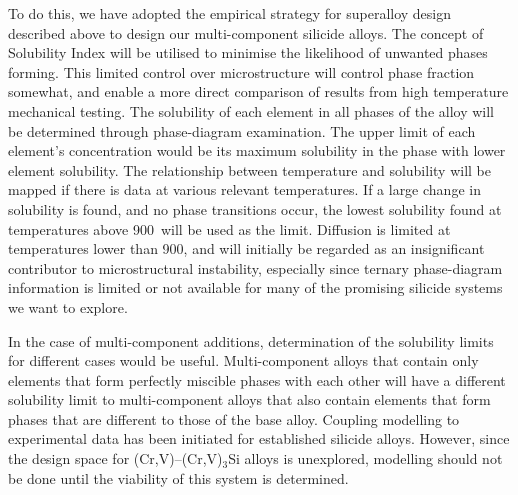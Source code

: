 To do this, we have adopted the empirical strategy for superalloy design described above to design our multi-component silicide alloys.  The concept of Solubility Index will be utilised to minimise the likelihood of unwanted phases forming.  This limited control over microstructure will control phase fraction somewhat, and enable a more direct comparison of results from high temperature mechanical testing.  The solubility of each element in all phases of the alloy will be determined through phase-diagram examination.  The upper limit of each element’s concentration would be its maximum solubility in the phase with lower element solubility.  The relationship between temperature and solubility will be mapped if there is data at various relevant temperatures.  If a large change in solubility is found, and no phase transitions occur, the lowest solubility found at temperatures above 900\celsius\ will be used as the limit.  Diffusion is limited at temperatures lower than 900\celsius, and will initially be regarded as an insignificant contributor to microstructural instability, especially since ternary phase-diagram information is limited or not available for many of the promising silicide systems we want to explore.	

In the case of multi-component additions, determination of the solubility limits for different cases would be useful.  Multi-component alloys that contain only elements that form perfectly miscible phases with each other will have a different solubility limit to multi-component alloys that also contain elements that form phases that are different to those of the base alloy.  Coupling modelling to experimental data has been initiated for established silicide alloys.  However, since the design space for (Cr,V)--(Cr,V)$_3$Si alloys is unexplored, modelling should not be done until the viability of this system is determined.


